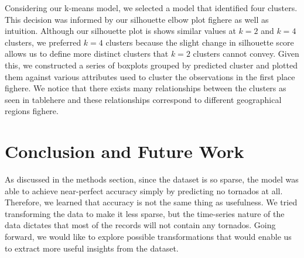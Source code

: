 \documentclass[conference]{IEEEtran}
\begin{document}
Considering our k-means model, we selected a model that identified four clusters. This decision was informed by our silhouette elbow plot fighere as well as intuition. Although our silhouette plot is shows similar values at $k = 2$ and $k =4$ clusters, we preferred $k = 4$ clusters because the slight change in silhouette score allows us to define more distinct clusters that $k  = 2$ clusters cannot convey. Given this, we constructed a series of boxplots grouped by predicted cluster and plotted them against various attributes used to cluster the observations in the first place fighere. We notice that there exists many relationships between the clusters as seen in tablehere and these relationships correspond to different geographical regions fighere.

\section{Conclusion and Future Work}

As discussed in the methods section, since the dataset is so sparse, the model was able to achieve near-perfect accuracy simply by predicting no tornados at all. Therefore, we learned that accuracy is not the same thing as usefulness. We tried transforming the data to make it less sparse, but the time-series nature of the data dictates that most of the records will not contain any tornados. Going forward, we would like to explore possible transformations that would enable us to extract more useful insights from the dataset.
\end{document}
